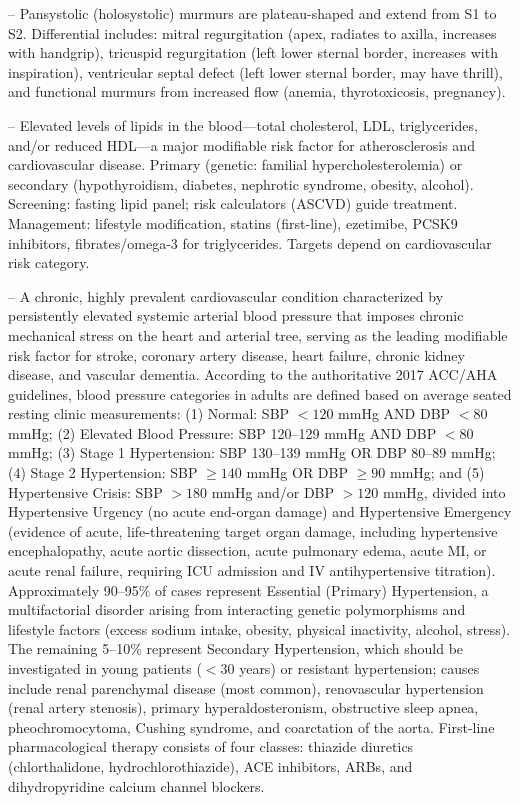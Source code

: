 -- Pansystolic (holosystolic) murmurs are plateau-shaped and extend from S1 to S2. Differential includes: mitral regurgitation (apex, radiates to axilla, increases with handgrip), tricuspid regurgitation (left lower sternal border, increases with inspiration), ventricular septal defect (left lower sternal border, may have thrill), and functional murmurs from increased flow (anemia, thyrotoxicosis, pregnancy).

-- Elevated levels of lipids in the blood—total cholesterol, LDL, triglycerides, and/or reduced HDL—a major modifiable risk factor for atherosclerosis and cardiovascular disease. Primary (genetic: familial hypercholesterolemia) or secondary (hypothyroidism, diabetes, nephrotic syndrome, obesity, alcohol). Screening: fasting lipid panel; risk calculators (ASCVD) guide treatment. Management: lifestyle modification, statins (first-line), ezetimibe, PCSK9 inhibitors, fibrates/omega-3 for triglycerides. Targets depend on cardiovascular risk category.

-- A chronic, highly prevalent cardiovascular condition characterized by persistently elevated systemic arterial blood pressure that imposes chronic mechanical stress on the heart and arterial tree, serving as the leading modifiable risk factor for stroke, coronary artery disease, heart failure, chronic kidney disease, and vascular dementia. According to the authoritative 2017 ACC/AHA guidelines, blood pressure categories in adults are defined based on average seated resting clinic measurements: (1) Normal: SBP $<120$ mmHg AND DBP $<80$ mmHg; (2) Elevated Blood Pressure: SBP 120--129 mmHg AND DBP $<80$ mmHg; (3) Stage 1 Hypertension: SBP 130--139 mmHg OR DBP 80--89 mmHg; (4) Stage 2 Hypertension: SBP $\ge 140$ mmHg OR DBP $\ge 90$ mmHg; and (5) Hypertensive Crisis: SBP $>180$ mmHg and/or DBP $>120$ mmHg, divided into Hypertensive Urgency (no acute end-organ damage) and Hypertensive Emergency (evidence of acute, life-threatening target organ damage, including hypertensive encephalopathy, acute aortic dissection, acute pulmonary edema, acute MI, or acute renal failure, requiring ICU admission and IV antihypertensive titration). Approximately 90--95\% of cases represent Essential (Primary) Hypertension, a multifactorial disorder arising from interacting genetic polymorphisms and lifestyle factors (excess sodium intake, obesity, physical inactivity, alcohol, stress). The remaining 5--10\% represent Secondary Hypertension, which should be investigated in young patients ($<30$ years) or resistant hypertension; causes include renal parenchymal disease (most common), renovascular hypertension (renal artery stenosis), primary hyperaldosteronism, obstructive sleep apnea, pheochromocytoma, Cushing syndrome, and coarctation of the aorta. First-line pharmacological therapy consists of four classes: thiazide diuretics (chlorthalidone, hydrochlorothiazide), ACE inhibitors, ARBs, and dihydropyridine calcium channel blockers.


